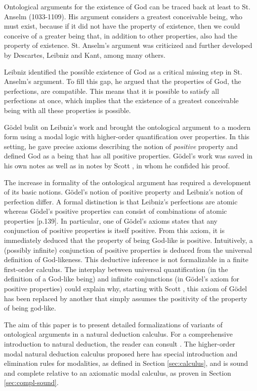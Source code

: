 \documentclass[smallextended]{svjour3}
\begin{document}
Ontological arguments for the existence of God can be traced back at least to St. Anselm (1033-1109). His argument considers a greatest conceivable being, who must exist, because if it did not have the property of existence, then we could conceive of a greater being that, in addition to other properties, also had the property of existence. St. Anselm's argument was criticized and further developed by Descartes, Leibniz and Kant, among many others. 

Leibniz identified the possible existence of God as a critical missing step in St. Anselm's argument. To fill this gap, he argued that the properties of God, the perfections, are compatible. This means that it is possible to satisfy all perfections at once, which implies that the existence of a greatest conceivable being with all these properties is possible. 

G\"odel bulit on Leibniz's work \citep{adams} and brought the ontological argument to a modern form using a modal logic with higher-order quantification over properties. In this setting, he gave precise axioms describing the notion of \emph{positive} property and defined God as a being that has all positive properties. G\"odel's work was saved in his own notes \citep{Goedel} as well as in notes by Scott \citep{scott}, in whom he confided his proof. 

The increase in formality of the ontological argument has required a development of its basic notions. G\"odel's notion of positive property and Leibniz's notion of perfection differ. A formal distinction is that Leibniz's perfections are atomic whereas G\"odel's positive properties can consist of combinations of atomic properties \citep{fitting}[p.139]. In particular, one of G\"odel's axioms states that any conjunction of positive properties is itself positive. From this axiom, it is immediately deduced that the property of being God-like is positive. Intuitively, a (possibly infinite) conjunction of positive properties is deduced from the universal definition of God-likeness. This deductive inference is not formalizable in a finite first-order calculus. The interplay between universal quantification (in the definition of a God-like being) and infinite conjunctions (in G\"odel's axiom for positive properties) could explain why, starting with Scott \citep{scott}, this axiom of G\"odel has been replaced by another that simply assumes the positivity of the property of being god-like. 

The aim of this paper is to present detailed formalizations of variants of ontological arguments in a natural deduction calculus. For a comprehensive introduction to natural deduction, the reader can consult \citep{prawitz}. The higher-order modal natural deduction calculus proposed here has special introduction and elimination rules for modalities, as defined in Section \ref{sec:calculus}, and is sound and complete relative to an axiomatic modal calculus, as proven in Section \ref{sec:compl-sound}.
\end{document}
